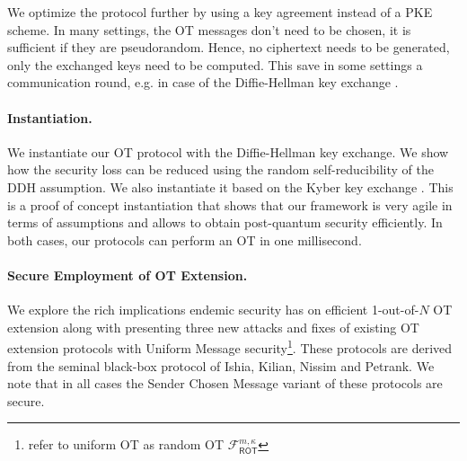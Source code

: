 We optimize the protocol further by using a key agreement instead of a PKE scheme. In many settings, the OT messages don't need to be chosen, it is sufficient if they are pseudorandom. Hence, no ciphertext needs to be generated, only the exchanged keys need to be computed. This save in some settings a communication round, e.g. in case of the Diffie-Hellman key exchange \cite{DifHel76}.

\paragraph{Instantiation.} We instantiate our OT protocol with the Diffie-Hellman key exchange. We show how the security loss can be reduced using the random self-reducibility of the DDH assumption. 
We also instantiate it based on the Kyber key exchange \cite{EPRINT:BDKLLS17,NISTPQC-R1:CRYSTALS-KYBER17}. This is a proof of concept instantiation that shows that our framework is very agile in terms of assumptions and allows to obtain post-quantum security efficiently. In both cases, our protocols can perform an OT in one millisecond.

\paragraph{Secure Employment of OT Extension.} 
We explore the rich implications endemic security has on efficient 1-out-of-$N$ OT extension along with presenting three new attacks and fixes of existing OT extension protocols\cite{C:KelOrsSch15,RSA:OrrOrsSch17} with Uniform Message security\footnote{\cite{C:KelOrsSch15,RSA:OrrOrsSch17} refer to uniform OT as random OT $\mathcal{F}^{m,\kappa}_{\textsf{ROT}}$}. These protocols are derived from the seminal black-box protocol of Ishia, Kilian, Nissim and Petrank\cite{C:IKNP03}. We note that in all cases the Sender Chosen Message variant of these protocols\cite{C:IKNP03,C:KelOrsSch15,RSA:OrrOrsSch17} are secure. 

